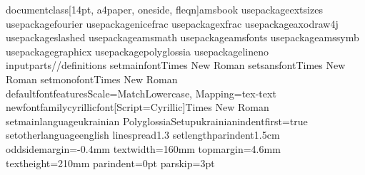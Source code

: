 \ d o c u m e n t c l a s s [ 1 4 p t ,   a 4 p a p e r ,   o n e s i d e ,   f l e q n ] { a m s b o o k } 
 %
 \ u s e p a c k a g e { e x t s i z e s } %
 \ u s e p a c k a g e { f o u r i e r } %
 %
 \ u s e p a c k a g e { n i c e f r a c } %
 \ u s e p a c k a g e { x f r a c } %
 %
 \ u s e p a c k a g e { a x o d r a w 4 j } %
 %
 \ u s e p a c k a g e { s l a s h e d } 
 %
 \ u s e p a c k a g e { a m s m a t h } %
 \ u s e p a c k a g e { a m s f o n t s } %
 \ u s e p a c k a g e { a m s s y m b } %
 \ u s e p a c k a g e { g r a p h i c x } %
 %
 \ u s e p a c k a g e { p o l y g l o s s i a }     %
 %
 \ u s e p a c k a g e { l i n e n o } 
 %
 %
 \ i n p u t { p a r t s / / d e f i n i t i o n s } 
 %
 \ s e t m a i n f o n t { T i m e s   N e w   R o m a n }     %
 \ s e t s a n s f o n t { T i m e s   N e w   R o m a n }     %
 \ s e t m o n o f o n t { T i m e s   N e w   R o m a n }     %
 %
 %
 %
 %
 \ d e f a u l t f o n t f e a t u r e s { S c a l e = M a t c h L o w e r c a s e ,   M a p p i n g = t e x - t e x t }     %
 \ n e w f o n t f a m i l y \ c y r i l l i c f o n t [ S c r i p t = C y r i l l i c ] { T i m e s   N e w   R o m a n } 
 \ s e t m a i n l a n g u a g e { u k r a i n i a n }     %
 \ P o l y g l o s s i a S e t u p { u k r a i n i a n } { i n d e n t f i r s t = t r u e } 
 \ s e t o t h e r l a n g u a g e { e n g l i s h } 
 %
 \ l i n e s p r e a d { 1 . 3 }   %
 \ s e t l e n g t h { \ p a r i n d e n t } { 1 . 5 c m }   %
 %
 \ o d d s i d e m a r g i n = - 0 . 4 m m   \ t e x t w i d t h = 1 6 0 m m   \ t o p m a r g i n = 4 . 6 m m   \ t e x t h e i g h t = 2 1 0 m m   \ p a r i n d e n t = 0 p t   \ p a r s k i p = 3 p t 
